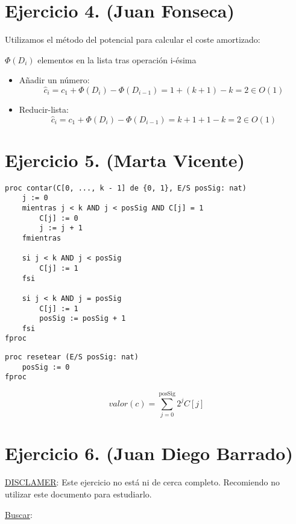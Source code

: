 \documentclass[10pt,a4paper,openright]{book}
\theoremstyle{break}
\begin{document}
\section{Ejercicio 4. (Juan Fonseca)}%
\label{sec:ejercicio_4}
Utilizamos el método del potencial para calcular el coste amortizado: 

$\Phi \left( D_i \right)$ elementos en la lista tras operación i-ésima
\begin{itemize}
    \item Añadir un número: 
    \[
    \hat{c}_i = c_1 + \Phi\left( D_i \right) - \Phi\left( D_{i-1} \right) = 1 + \left( k + 1 \right) - k = 2 \in O\left( 1 \right)
    \]
    \item Reducir-lista: 
    \[
    \hat{c}_i = c_1 + \Phi\left( D_i \right) - \Phi\left( D_{i-1} \right) = k + 1 + 1 - k = 2 \in O\left( 1 \right)
    \]
\end{itemize}

\section{Ejercicio 5. (Marta Vicente)}%
\label{sec:ejercicio_5}
\begin{lstlisting}
proc contar(C[0, ..., k - 1] de {0, 1}, E/S posSig: nat)
    j := 0
    mientras j < k AND j < posSig AND C[j] = 1
        C[j] := 0
        j := j + 1
    fmientras

    si j < k AND j < posSig
        C[j] := 1
    fsi

    si j < k AND j = posSig
        C[j] := 1
        posSig := posSig + 1
    fsi
fproc
\end{lstlisting}

\begin{lstlisting}
proc resetear (E/S posSig: nat)
    posSig := 0
fproc
\end{lstlisting}
\[
valor\left( c \right) = \sum_{j=0}^{\text{posSig}} 2^jC\left[ j \right]  
\]

\section{Ejercicio 6. (Juan Diego Barrado)}%
\label{sec:ejercicio_6}
\underline{DISCLAMER}: Este ejercicio no está ni de cerca completo. Recomiendo no utilizar este documento para estudiarlo. 


\underline{Buscar}:
\end{document}
